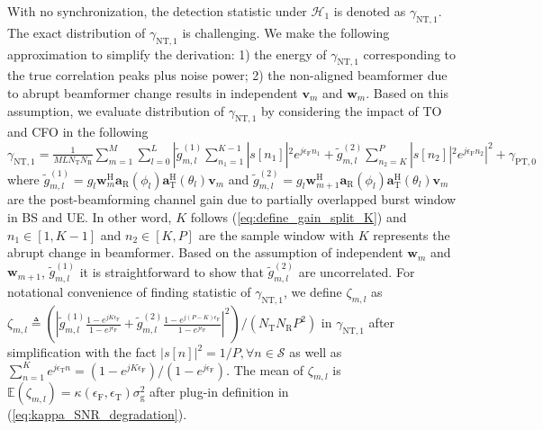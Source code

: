 \documentclass[journal]{IEEEtran}
\newcommand{\tx}[0]{\text{T}}
\newcommand{\rx}[0]{\text{R}}
\newcommand{\hermitian}[0]{\text{H}}
\newcommand{\CFO}[0]{\epsilon_{\text{F}}}
\newcommand{\STO}[0]{\epsilon_{\text{T}}}
\begin{document}
With no synchronization, the detection statistic under $\mathcal{H}_1$ is denoted as $\gamma_{\text{NT},1}$. The exact distribution of $\gamma_{\text{NT},1}$ is challenging. We make the following approximation to simplify the derivation: 1) the energy of $\gamma_{\text{NT},1}$ corresponding to the true correlation peaks plus noise power; 2) the non-aligned beamformer due to abrupt beamformer change results in independent $\mathbf{v}_m$ and $\mathbf{w}_m$. Based on this assumption, we evaluate distribution of $\gamma_{\text{NT},1}$ by considering the impact of TO and CFO in the following
$\gamma_{\text{NT},1} = \frac{1}{MLN_{\tx}N_{\rx}}\sum_{m=1}^{M}\sum_{l=0}^{L}|\tilde{g}^{(1)}_{m,l}\sum_{n_1=1}^{K-1}|s[n_1]|^2e^{j\CFO n_1}+\tilde{g}^{(2)}_{m,l}\sum_{n_2=K}^{P}|s[n_2]|^2e^{j\CFO n_2}|^2 + \gamma_{\text{PT},0}$
where 
$\tilde{g}^{(1)}_{m,l} =  g_l\mathbf{w}^{\hermitian}_m\mathbf{a}_{\rx}(\phi_l)\mathbf{a}^{\hermitian}_{\tx}(\theta_l)\mathbf{v}_m$ and $\tilde{g}^{(2)}_{m,l} =  g_l\mathbf{w}^{\hermitian}_{m+1}\mathbf{a}_{\rx}(\phi_l)\mathbf{a}^{\hermitian}_{\tx}(\theta_l)\mathbf{v}_m$
are the post-beamforming channel gain due to partially overlapped burst window in BS and UE. In other word, $K$ follows (\ref{eq:define_gain_split_K}) and $n_1\in [1,K-1]$ and $n_2\in [K,P]$ are the sample window with $K$ represents the abrupt change in beamformer. Based on the assumption of independent $\mathbf{w}_m$ and $\mathbf{w}_{m+1}$, $\tilde{g}^{(1)}_{m,l}$ it is straightforward to show that $\tilde{g}^{(2)}_{m,l}$ are uncorrelated.
For notational convenience of finding statistic of $\gamma_{\text{NT},1}$, we define $\zeta_{m,l}$ as $
\zeta_{m,l} 
\triangleq  (|\tilde{g}^{(1)}_{m,l}\frac{1-e^{jK\CFO}}{1-e^{j\CFO }}+ \tilde{g}^{(2)}_{m,l}\frac{1-e^{j(P-K)\CFO}}{1-e^{j\CFO }}|^2)/(N_{\tx}N_{\rx}P^2)$
in $\gamma_{\text{NT},1}$ after simplification with the fact $|s[n]|^2 = 1/P, \forall n\in \mathcal{S}$ as well as $\sum_{n=1}^{K}e^{j\STO n} = (1-e^{jK\CFO})/(1-e^{j\CFO})$. The mean of $\zeta_{m,l}$ is $\mathbb{E}\left(\zeta_{m,l}\right)= \kappa(\CFO,\STO)\sigma_{\text{g}}^2$ after plug-in definition in (\ref{eq:kappa_SNR_degradation}).
\end{document}

